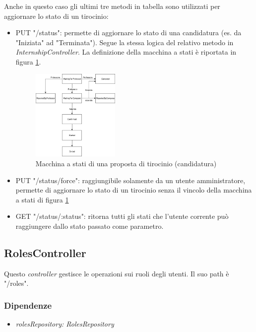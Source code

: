 Anche in questo caso gli ultimi tre metodi in tabella sono utilizzati per aggiornare lo stato di un tirocinio:
\begin{itemize}
	\item PUT "/status": permette di aggiornare lo stato di una candidatura (es. da "Iniziata" ad "Terminata"). Segue la stessa logica del relativo metodo in \textit{InternshipController}. La definizione della macchina a stati è riportata in figura \ref{fig:internship-proposal-state-machine}.
	\begin{figure}[H] 
		\centering    
		\includegraphics[width=0.4\textwidth]{Chapter4/Figs/internship-proposal-state-machine}
		\caption[Macchina a stati di una proposta di tirocinio (candidatura)]{Macchina a stati di una proposta di tirocinio (candidatura)}
		\label{fig:internship-proposal-state-machine}
	\end{figure}
	\item PUT "/status/force": raggiungibile solamente da un utente amministratore, permette di aggiornare lo stato di un tirocinio senza il vincolo della macchina a stati di 	figura \ref{fig:internship-proposal-state-machine}
	\item GET "/status/:status": ritorna tutti gli stati che l'utente corrente può raggiungere dallo stato passato come parametro.
\end{itemize}

\subsection{RolesController}

Questo \textit{controller} gestisce le operazioni sui ruoli degli utenti. Il suo path è "/roles".
\subsubsection{Dipendenze}
\begin{itemize}[itemsep=0pt]
	\item \textit{rolesRepository: RolesRepository}
\end{itemize}

